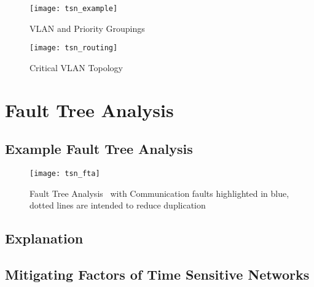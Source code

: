 \begin{figure}[H]
\centering
\texttt{[image: tsn\_example]}
\caption{VLAN and Priority Groupings}
\label{fig:vlans}
\end{figure}

\begin{figure}[H]
\centering
\texttt{[image: tsn\_routing]}
\caption{Critical VLAN Topology}
\label{fig:topology}
\end{figure}


\section{Fault Tree Analysis}

\subsection{Example Fault Tree Analysis}

\begin{figure}[H]
\centering
\texttt{[image: tsn\_fta]}
\caption{Fault Tree Analysis~\cite{w.e.veselyFaultTreeHandbook1981} with Communication faults highlighted in blue, dotted lines are intended to reduce duplication}
\end{figure}

\subsection{Explanation}

%

\subsection{Mitigating Factors of Time Sensitive Networks}

